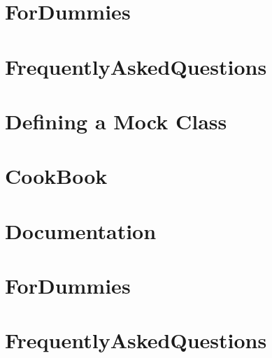 \documentclass[twoside]{book}
\newcommand{\+}{\discretionary{\mbox{\scriptsize$\hookleftarrow$}}{}{}}
\begin{document}
\chapter{For\+Dummies}
\label{md_vendor_googletest_googlemock_docs_v1_5__for_dummies}

\chapter{Frequently\+Asked\+Questions}
\label{md_vendor_googletest_googlemock_docs_v1_5__frequently_asked_questions}

\chapter{Defining a Mock Class}
\label{md_vendor_googletest_googlemock_docs_v1_6__cheat_sheet}

\chapter{Cook\+Book}
\label{md_vendor_googletest_googlemock_docs_v1_6__cook_book}

\chapter{Documentation}
\label{md_vendor_googletest_googlemock_docs_v1_6__documentation}

\chapter{For\+Dummies}
\label{md_vendor_googletest_googlemock_docs_v1_6__for_dummies}

\chapter{Frequently\+Asked\+Questions}
\label{md_vendor_googletest_googlemock_docs_v1_6__frequently_asked_questions}

\end{document}

